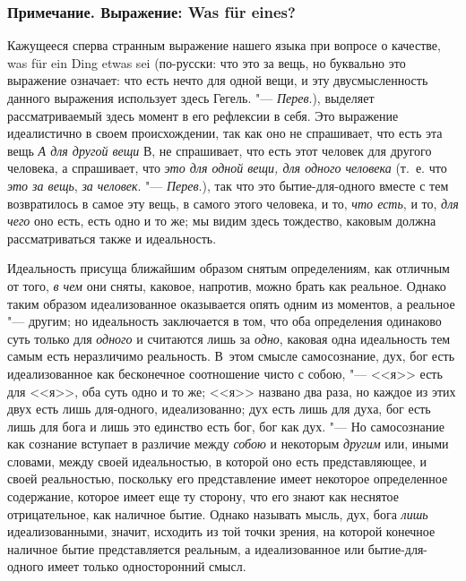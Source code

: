 \subsubsection[Примечание. Выражение: Was für eines?]
{Примечание. Выражение: Was für eines?}

Кажущееся сперва странным выражение нашего языка при вопросе о качестве, was
für ein Ding etwas sei (по-русски: что это за вещь, но буквально это
выражение означает: что есть нечто для одной вещи, и эту двусмысленность
данного выражения использует здесь Гегель. "--- {\em Перев}.), выделяет
рассматриваемый здесь момент в его рефлексии в себя. Это выражение
идеалистично в своем происхождении, так как оно не спрашивает, что есть эта
вещь {\em А для другой вещи} В, не спрашивает, что есть
этот человек для другого человека, а спрашивает, что
{\em это для одной вещи, для одного человека} (т.~е.
что {\em это за вещь}, {\em за
человек}. "--- {\em Перев}.), так что это бытие-для-одного вместе с тем
возвратилось в самое эту вещь, в самого этого человека, и то,
{\em что есть}, и то, {\em для
чего} оно есть, есть одно и то же; мы видим здесь тождество, каковым должна
рассматриваться также и идеальность.

Идеальность присуща ближайшим образом снятым определениям, как отличным от
того, {\em в чем} они сняты, каковое, напротив, можно
брать как реальное. Однако таким образом идеализованное оказывается опять
одним из моментов, а реальное "--- другим; но идеальность заключается в том,
что оба определения одинаково суть только для
{\em одного} и считаются лишь за
{\em одно}, каковая одна идеальность тем самым есть
неразличимо реальность. В~этом смысле самосознание, дух, бог есть
идеализованное как бесконечное соотношение чисто с собою, "--- <<я>> есть для
<<я>>, оба суть одно и то же; <<я>> названо два раза, но каждое из этих двух
есть лишь для-одного, идеализованно; дух есть лишь для духа, бог есть лишь
для бога и лишь это единство есть бог, бог как дух. "--- Но самосознание как
сознание вступает в различие между {\em собою} и
некоторым {\em другим} или, иными словами, между своей
идеальностью, в которой оно есть представляющее, и своей реальностью,
поскольку его представление имеет некоторое определенное содержание,
которое имеет еще ту сторону, что его знают как неснятое отрицательное,
как наличное бытие. Однако называть мысль, дух, бога
{\em лишь} идеализованными, значит, исходить из той
точки зрения, на которой конечное наличное бытие представляется реальным, а
идеализованное или бытие-для-одного имеет только односторонний смысл.

